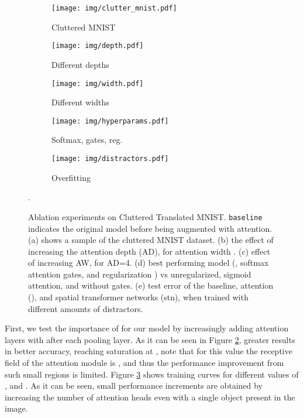 \documentclass[runningheads]{llncs}
\begin{document}
\begin{figure}[!t]
\centering
\begin{subfigure}[!t]{0.26\textwidth}
\centering
\texttt{[image: img/clutter\_mnist.pdf]}
\caption{Cluttered MNIST}
\label{fig:clutter_mnist}
\end{subfigure}
\begin{subfigure}[!t]{0.32\textwidth}
\centering
\texttt{[image: img/depth.pdf]}
\caption{Different depths}
\label{fig:ablation_depth}
\end{subfigure}
\begin{subfigure}[!t]{0.32\textwidth}
\centering
\texttt{[image: img/width.pdf]}
\caption{Different widths}
\label{fig:ablation_width}
\end{subfigure}
\begin{subfigure}[!t]{0.32\textwidth}
\centering
\texttt{[image: img/hyperparams.pdf]}
\caption{Softmax, gates, reg.}
\label{fig:hyperparams}
\end{subfigure}
\begin{subfigure}[!t]{0.32\textwidth}
\centering
\texttt{[image: img/distractors.pdf]}
\caption{Overfitting}
\label{fig:distractors}
\end{subfigure}
\caption{Ablation experiments on Cluttered Translated MNIST. \texttt{baseline} indicates the original model before being augmented with attention. (a) shows a sample of the cluttered MNIST dataset. (b) the effect of increasing the attention depth (AD), for attention width . (c) effect of increasing AW, for AD=4. (d) best performing model (, softmax attention gates, and regularization \cite{zhao2017diversified}) vs unregularized, sigmoid attention, and without gates. (e) test error of the baseline, attention (), and spatial transformer networks (stn), when trained with different amounts of distractors. }.
\label{fig:ablation}
\end{figure}

First, we test the importance of  for our model by increasingly adding attention layers with  after each pooling layer. As it can be seen in Figure \ref{fig:ablation_depth}, greater  results in better accuracy, reaching saturation at , note that for this value the receptive field of the attention module is , and thus the performance improvement from such small regions is limited. Figure \ref{fig:ablation_width} shows training curves for different values of , and . As it can be seen, small performance increments are obtained by increasing the number of attention heads even with a single object present in the image. 
\end{document}
